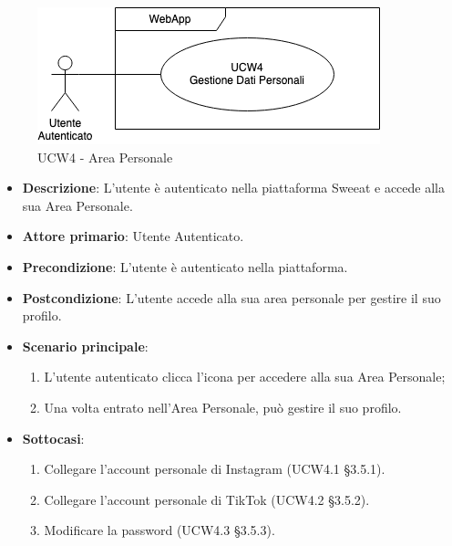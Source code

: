 \begin{figure}[!h]
\centering
\includegraphics[scale=0.5]{UC_images/UCW4.png}
\caption{UCW4 - Area Personale}
\end{figure}
\begin{itemize}
\item \textbf{Descrizione}: L'utente è autenticato nella piattaforma Sweeat e accede alla sua Area Personale.
\item \textbf{Attore primario}: Utente Autenticato.
\item \textbf{Precondizione}: L'utente è autenticato nella piattaforma.
\item \textbf{Postcondizione}: L'utente accede alla sua area personale per gestire il suo profilo.

\item \textbf{Scenario principale}:
\begin{enumerate}
\item L'utente autenticato clicca l'icona per accedere alla sua Area Personale;
\item Una volta entrato nell'Area Personale, può gestire il suo profilo.
\end{enumerate}

\item \textbf{Sottocasi}:
\begin{enumerate}
	\item Collegare l'account personale di Instagram (UCW4.1 \S 3.5.1).
	\item Collegare l'account personale di TikTok (UCW4.2 \S 3.5.2).
	\item Modificare la password (UCW4.3 \S 3.5.3). 
\end{enumerate}
\end{itemize}
